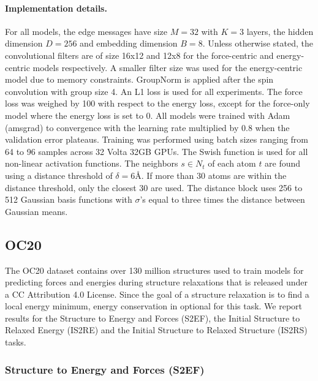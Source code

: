 \paragraph{Implementation details.}

For all models, the edge messages have size $M=32$ with $K=3$ layers, the hidden dimension $D=256$ and embedding dimension $B=8$. Unless otherwise stated, the convolutional filters are of size 16x12 and 12x8 for the force-centric and energy-centric models respectively. A smaller filter size was used for the energy-centric model due to memory constraints. GroupNorm \cite{wu2018group} is applied after the spin convolution with group size 4. An L1 loss is used for all experiments. The force loss was weighed by 100 with respect to the energy loss, except for the force-only model where the energy loss is set to 0. All models were trained with Adam (amsgrad) to convergence with the learning rate multiplied by 0.8 when the validation error plateaus. Training was performed using batch sizes ranging from 64 to 96 samples across 32 Volta 32GB GPUs. The Swish \cite{ramachandran2017searching} function is used for all non-linear activation functions. The neighbors $s\in N_t$ of each atom $t$ are found using a distance threshold of $\delta = 6$\AA. If more than 30 atoms are within the distance threshold, only the closest 30 are used.  The distance block uses 256 to 512 Gaussian basis functions with $\sigma$'s equal to three times the distance between Gaussian means. 

\subsection{OC20}

The OC20 dataset \cite{OC20} contains over 130 million structures used to train models for predicting forces and energies during structure relaxations that is released under a CC Attribution 4.0 License. Since the goal of a structure relaxation is to find a local energy minimum, energy conservation in optional for this task. We report results for the Structure to Energy and Forces (S2EF), the Initial Structure to Relaxed Energy (IS2RE) and the Initial Structure to Relaxed Structure (IS2RS) tasks. 

\subsubsection{Structure to Energy and Forces (S2EF)}

